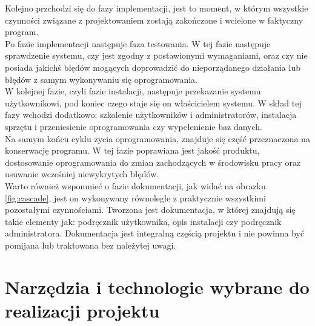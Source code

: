 \documentclass[12pt]{article}
\begin{document}
\begin{sloppypar}
{{  Kolejno przchodzi się do fazy implementacji, jest to moment, w którym wszystkie czynności związane z projektowaniem zostają zakończone i wcielone w faktyczny program.\\
  Po fazie implementacji następuje faza testowania. 
  W tej fazie następuje sprawdzenie systemu, czy jest zgodny z postawionymi wymaganiami, 
  oraz czy nie posiada jakichś błędów mogących doprowadzić do nieporządanego działania lub błędów z samym wykonywaniu się oprogramowania.\\
  W kolejnej fazie, czyli fazie instalacji, następuje przekazanie systemu użytkownikowi, pod koniec czego staje się on właścicielem systemu. 
  W skład tej fazy wchodzi dodatkowo: szkolenie użytkowników i administratorów, instalacja sprzętu i przeniesienie oprogramowania czy wypełenienie baz danych.\\
  Na samym końcu cyklu życia oprogramowania, znajduje się część przeznaczona na konserwację programu. 
  W tej fazie poprawiana jest jakość produktu, dostosowanie oprogramowania do zmian zachodzących w środowisku pracy oraz usuwanie wcześniej niewykrytych błędów.\\
  Warto również wspomnieć o fazie dokumentacji, jak widać na obrazku \ref{fig:cascade}, jest on wykonywany równolegle z praktycznie wszystkimi pozostałymi czynnościami. 
  Tworzona jest dokumentacja, w której znajdują się takie elementy jak: podręcznik użytkownika, opis instalacji czy podręcznik administratora. 
  Dokumentacja jest integralną częścią projektu i nie powinna być pomijana lub traktowana bez należytej uwagi.
}
}

\section{Narzędzia i technologie wybrane do realizacji projektu}
{
}
\end{sloppypar}
\end{document}
